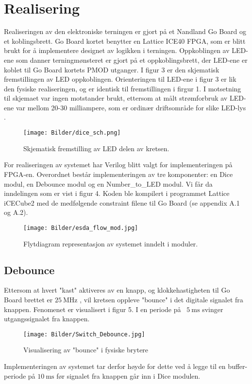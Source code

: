 \section{Realisering}
\label{realiseringOgTest}

Realiseringen av den elektroniske terningen er gjort på et Nandland Go Board \cite{goboard} 
og et koblingsbrett. Go Board kortet benytter en Lattice ICE40 FPGA, som er 
blitt brukt for å implementere designet av logikken i terningen. Oppkoblingen av 
LED-ene som danner terningmønsteret er gjort på et oppkoblingsbrett, der LED-ene 
er koblet til Go Board kortets PMOD utganger. I figur 3 er den skjematisk fremstillingen 
av LED oppkoblingen. Orienteringen til LED-ene i figur 3 er lik den fysiske 
realiseringen, og er identisk til fremstillingen i firgur 1. I motsetning til skjemaet var ingen motstander brukt,
ettersom at målt strømforbruk av LED-ene var mellom 20-30 milliampere, som er ordinær driftsområde for slike LED-lys \cite{ledcurrent}.

\begin{figure}[H]
    \centering
    \texttt{[image: Bilder/dice\_sch.png]}
    \caption{Skjematisk fremstilling av LED delen av kretsen.}    
\end{figure}


For realiseringen av systemet har Verilog blitt valgt for implementeringen på FPGA-en. Overordnet består implementeringen av tre komponenter:
en Dice modul, en Debounce modul og en Number\_to\_LED modul. Vi får da inndelingen som er vist i figur 4.
Koden ble kompilert i programmet Lattice iCECube2 med de medfølgende constraint 
filene til Go Board (se appendix A.1 og A.2).
\begin{figure}[H]
    \centering
    \texttt{[image: Bilder/esda\_flow\_mod.jpg]}
    \caption{Flytdiagram representasjon av systemet inndelt i moduler.}
\end{figure}


\subsection{Debounce}
Ettersom at hvert "kast" aktiveres av en knapp, og klokkehastigheten til Go Board brettet er $\SI{25}{\mega\hertz}$ \cite{goboard}, vil 
kretsen oppleve "bounce" i det digitale signalet fra knappen. Fenomenet er visualisert i figur 5. I en periode 
på ~$\SI{5}{\milli\s}$ \cite{bouncedur} svinger utgangssignalet fra knappen.
\begin{figure}[H]
    \centering
    \texttt{[image: Bilder/Switch\_Debounce.jpg]}
    \caption{Visualisering av "bounce" i fysiske brytere \cite{bounce}}
\end{figure}
Implementeringen av systemet tar derfor høyde for dette ved å legge til en buffer-periode 
på $\SI{10}{\milli\s}$ før signalet fra knappen går inn i Dice modulen.

